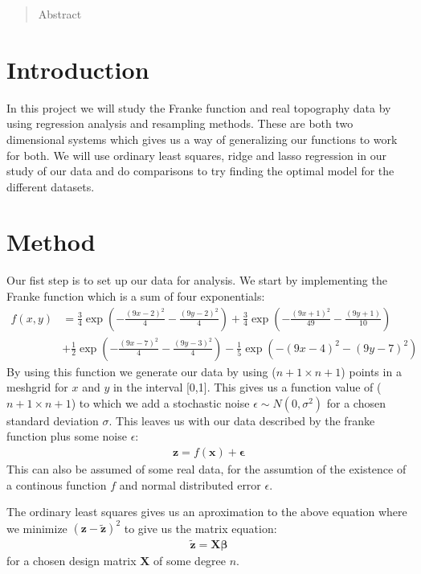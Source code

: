 \documentclass[12pt]{article}
\title{}
\author{}
\date{\today}
\begin{document}
\maketitle
\begin{abstract}
  Abstract
\end{abstract}
\tableofcontents
\section{Introduction}
In this project we will study the Franke function and real topography data by using regression analysis and resampling methods. These are both two dimensional systems which gives us a way of generalizing our functions to work for both. We will use ordinary least squares, ridge and lasso regression in our study of our data and do comparisons to try finding the optimal model for the different datasets.
\section{Method}
Our fist step is to set up our data for analysis. We start by implementing the Franke function which is a sum of four exponentials:
\begin{align*}
  f(x,y) &= \frac{3}{4 }\exp\left(- \frac{(9x -2 )^2}{4} - \frac{(9y-2)^2}{4}\right) +\frac{3}{4}\exp{\left(-\frac{(9x+1)^2}{49}- \frac{(9y+1)}{10}\right)} \\
&+\frac{1}{2}\exp{\left(-\frac{(9x-7)^2}{4} - \frac{(9y-3)^2}{4}\right)} -\frac{1}{5}\exp{\left( -(9x-4)^2 - (9y-7)^2\right) }
\end{align*}
By using this function we generate our data by using ($n+1\times n+1$) points in a meshgrid for $x$ and $y$ in the interval [0,1]. This gives us a function value of ($n+1 \times n+1$) to which we add a stochastic noise $\epsilon \sim N(0,\sigma^2)$ for a chosen standard deviation $\sigma$. This leaves us with our data described by the franke function plus some noise $\epsilon$:
\begin{align*}
  \boldsymbol{z} = f(\boldsymbol{x}) + \boldsymbol{\epsilon}
\end{align*}
This can also be assumed of some real data, for the assumtion of the existence of a continous function $f$ and normal distributed error $\epsilon$.

The ordinary least squares gives us an aproximation to the above equation where we minimize $(\boldsymbol{z} - \boldsymbol{\tilde{z}})^2$ to give us the matrix equation:
\begin{align*}
  \boldsymbol{\tilde{z}} = \boldsymbol{X}\boldsymbol{\beta}
\end{align*}
for a chosen design matrix $\boldsymbol{X}$ of some degree $n$.
\end{document}
